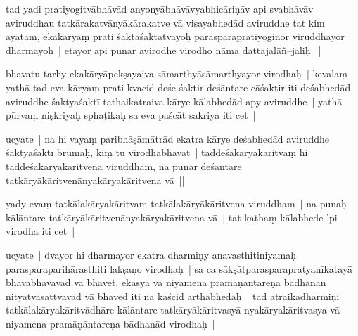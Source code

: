 \documentclass[article,12pt,a4paper]{memoir}%
\newcounter{parCount}
\begin{document}
	  \pstart \leavevmode%
	\label{thakur75-78.12}tad yadi pratiyogitvābhāvād anyonyābhāvāvyabhicāriṇāv api svabhāvāv aviruddhau tatkārakatvānyākārakatve vā viṣayabhedād aviruddhe tat kim āyātam, ekakāryaṃ prati śaktāśaktatvayoḥ parasparapratiyoginor viruddhayor dharmayoḥ | etayor api punar avirodhe virodho nāma dattajalāñ–jaliḥ ||
	{}
	\pend%
      

	  \pstart \leavevmode%
	\label{thakur75-78.16}bhavatu tarhy ekakāryāpekṣayaiva sāmarthyāsāmarthyayor virodhaḥ | kevalaṃ yathā tad eva kāryaṃ prati kvacid deśe śaktir deśāntare cāśaktir iti deśabhedād aviruddhe śaktyaśaktī tathaikatraiva kārye kālabhedād apy aviruddhe | yathā pūrvaṃ niṣkriyaḥ sphaṭikaḥ sa eva paścāt sakriya iti cet |
	{}
	\pend%
      

	  \pstart \leavevmode%
	\label{thakur75-78.19}ucyate | na hi vayaṃ paribhāṣāmātrād ekatra kārye deśabhedād aviruddhe śaktyaśaktī brūmaḥ, kiṃ tu virodhābhāvāt | taddeśakāryakāritvaṃ hi taddeśakāryākāritvena viruddham, na punar deśāntare tatkāryākāritvenānyakāryakāritvena vā ||
	{}
	\pend%
      

	  \pstart \leavevmode%
	\label{thakur75-78.23}yady evaṃ tatkālakāryakāritvaṃ tatkālakāryākāritvena viruddham | na punaḥ kālāntare tatkāryākāritvenānyakāryakāritvena vā | tat kathaṃ kālabhede 'pi virodha iti cet |
	{}
	\pend%
      

	  \pstart \leavevmode%
	\label{thakur75-78.25}ucyate | dvayor hi dharmayor ekatra dharmiṇy anavasthitiniyamaḥ parasparaparihārasthiti lakṣaṇo virodhaḥ | sa ca sākṣātparasparapratyanīkatayā bhāvābhāvavad vā bhavet, ekasya vā niyamena pramāṇāntareṇa bādhanān nityatvasattvavad vā bhaved iti na kaścid arthabhedaḥ | tad atraikadharmiṇi tatkālakāryakāritvādhāre kālāntare tatkāryākāritvasyā nyakāryakāritvasya vā niyamena pramāṇāntareṇa bādhanād virodhaḥ | 
	{}
	\pend%
      
\end{document}
